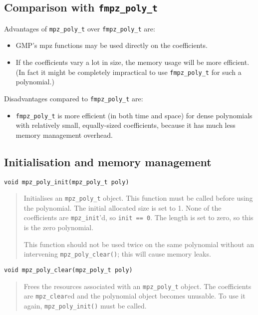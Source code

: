 \documentclass[a4paper,10pt]{article}
\newcommand{\code}{\lstinline}
\begin{document}
\subsection{Comparison with \code{fmpz_poly_t}}

Advantages of \code{mpz_poly_t} over \code{fmpz_poly_t} are:
\begin{itemize}
\item GMP's mpz functions may be used directly on the coefficients.
\item If the coefficients vary a lot in size, the memory usage will be more efficient. (In fact it might be completely impractical to use \code{fmpz_poly_t} for such a polynomial.)
\end{itemize}

Disadvantages compared to \code{fmpz_poly_t} are:
\begin{itemize}
\item \code{fmpz_poly_t} is more efficient (in both time and space) for dense polynomials with relatively small, equally-sized coefficients, because it has much less memory management overhead.
\end{itemize}


\subsection{Initialisation and memory management}

\begin{lstlisting}
void mpz_poly_init(mpz_poly_t poly)
\end{lstlisting}
\begin{quote}
Initialises an \code{mpz_poly_t} object. This function must be called before using the polynomial. The initial allocated size is set to 1. None of the coefficients are \code{mpz_init}'d, so \code{init == 0}. The length is set to zero, so this is the zero polynomial. 

This function should not be used twice on the same polynomial without an intervening \code{mpz_poly_clear()}; this will cause memory leaks.
\end{quote}

\begin{lstlisting}
void mpz_poly_clear(mpz_poly_t poly)
\end{lstlisting}
\begin{quote}
Frees the resources associated with an \code{mpz_poly_t} object. The coefficients are \code{mpz_clear}ed and the polynomial object becomes unusable. To use it again, \code{mpz_poly_init()} must be called.
\end{quote}
\end{document}
